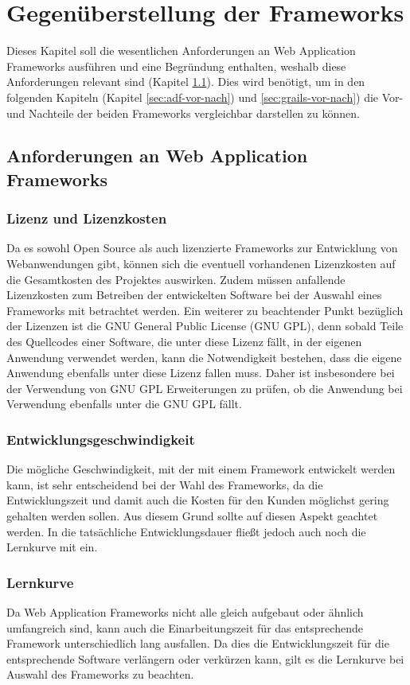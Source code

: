 \section{Gegenüberstellung der Frameworks}
\label{cha:kapitel-3}
Dieses Kapitel soll die wesentlichen Anforderungen an Web Application Frameworks ausführen und eine Begründung enthalten, weshalb diese Anforderungen relevant sind (Kapitel \ref{sec:anforderungskatalog}). Dies wird benötigt, um in den folgenden Kapiteln (Kapitel \ref{sec:adf-vor-nach}) und \ref{sec:grails-vor-nach}) die Vor- und Nachteile der beiden Frameworks vergleichbar darstellen zu können.
\subsection{Anforderungen an Web Application Frameworks}
\label{sec:anforderungskatalog}
\subsubsection*{Lizenz und Lizenzkosten}
Da es sowohl Open Source als auch lizenzierte Frameworks zur Entwicklung von Webanwendungen gibt, können sich die eventuell vorhandenen Lizenzkosten auf die Gesamtkosten des Projektes auswirken. Zudem müssen anfallende Lizenzkosten zum Betreiben der entwickelten Software bei der Auswahl eines Frameworks mit betrachtet werden.
Ein weiterer zu beachtender Punkt bezüglich der Lizenzen ist die GNU General Public License (GNU GPL), denn sobald Teile des Quellcodes einer Software, die unter diese Lizenz fällt, in der eigenen Anwendung verwendet werden, kann die Notwendigkeit bestehen, dass die eigene Anwendung ebenfalls unter diese Lizenz fallen muss. Daher ist insbesondere bei der Verwendung von GNU GPL Erweiterungen zu prüfen, ob die Anwendung bei Verwendung ebenfalls unter die GNU GPL fällt.\autocite[S.214]{EFCMW2013} 
\subsubsection*{Entwicklungsgeschwindigkeit}
Die mögliche Geschwindigkeit, mit der mit einem Framework entwickelt werden kann, ist sehr entscheidend bei der Wahl des Frameworks, da die Entwicklungszeit und damit auch die Kosten für den Kunden möglichst gering gehalten werden sollen. Aus diesem Grund sollte auf diesen Aspekt geachtet werden. In die tatsächliche Entwicklungsdauer fließt jedoch auch noch die Lernkurve mit ein.\autocite[S.214]{EFCMW2013}
\subsubsection*{Lernkurve}
Da Web Application Frameworks nicht alle gleich aufgebaut oder ähnlich umfangreich sind, kann auch die Einarbeitungszeit für das entsprechende Framework unterschiedlich lang ausfallen. Da dies die Entwicklungszeit für die entsprechende Software verlängern oder verkürzen kann, gilt es die Lernkurve bei Auswahl des Frameworks zu beachten.\autocite[S.214]{EFCMW2013}
